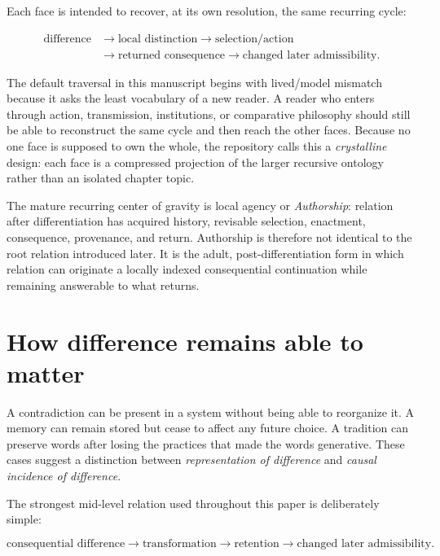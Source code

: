 \documentclass[11pt]{article}
\begin{document}
Each face is intended to recover, at its own resolution, the same recurring cycle:

\begin{equation}
\begin{aligned}
\text{difference}&\rightarrow\text{local distinction}\rightarrow\text{selection/action}\\
&\rightarrow\text{returned consequence}\rightarrow\text{changed later admissibility}.
\end{aligned}
\end{equation}

The default traversal in this manuscript begins with lived/model mismatch because it asks the least vocabulary of a new reader. A reader who enters through action, transmission, institutions, or comparative philosophy should still be able to reconstruct the same cycle and then reach the other faces. Because no one face is supposed to own the whole, the repository calls this a \emph{crystalline} design: each face is a compressed projection of the larger recursive ontology rather than an isolated chapter topic.

The mature recurring center of gravity is local agency or \emph{Authorship}: relation after differentiation has acquired history, revisable selection, enactment, consequence, provenance, and return. Authorship is therefore not identical to the root relation introduced later. It is the adult, post-differentiation form in which relation can originate a locally indexed consequential continuation while remaining answerable to what returns.

\section{How difference remains able to matter}

A contradiction can be present in a system without being able to reorganize it. A memory can remain stored but cease to affect any future choice. A tradition can preserve words after losing the practices that made the words generative. These cases suggest a distinction between \emph{representation of difference} and \emph{causal incidence of difference}.

The strongest mid-level relation used throughout this paper is deliberately simple:

\begin{equation}
\text{consequential difference}
\rightarrow \text{transformation}
\rightarrow \text{retention}
\rightarrow \text{changed later admissibility}.
\end{equation}
\end{document}
